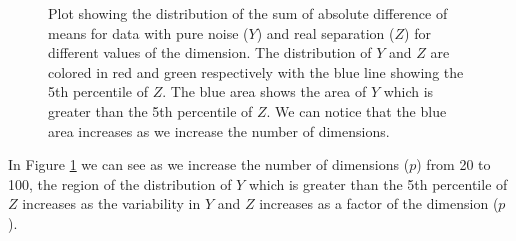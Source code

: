 \documentclass[12]{article}
\begin{document}
%
\begin{figure}[hbtp]
   \centering
       \caption{Plot showing the distribution of the sum of absolute difference of means for data with pure noise ($Y$) and real separation ($Z$) for different values of the dimension. The distribution of $Y$ and $Z$ are colored in red and green respectively with the blue line showing the 5th percentile of $Z$. The blue area shows the area of $Y$ which is greater than the 5th percentile of $Z$. We can notice that the blue area increases as we increase the number of dimensions. }
     \label{fig:dimen}
\end{figure}

In Figure \ref{fig:dimen} we can see as we increase the number of dimensions ($p$) from 20 to 100, the region of the distribution of $Y$ which is greater than the 5th percentile of $Z$ increases as the variability in $Y$ and $Z$ increases as a factor of the dimension ($p$).

\end{document}
